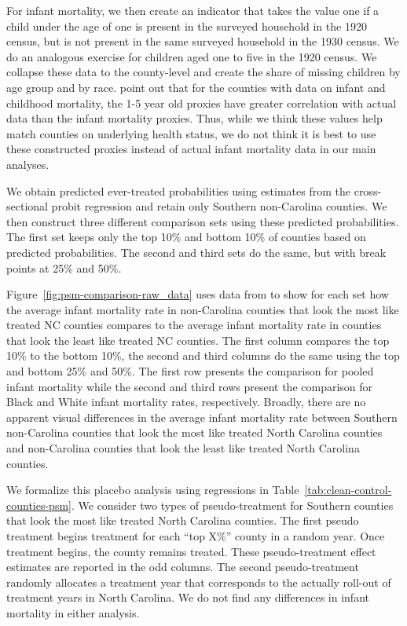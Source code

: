 \documentclass[12pt]{article}
\begin{document}
For infant mortality, we then create an indicator that takes the value one if a child under the age of one is present in the surveyed household in the 1920 census, but is not present in the same surveyed household in the 1930 census. 
We do an analogous exercise for children aged one to five in the 1920 census. 
We collapse these data to the county-level and create the share of missing children by age group and by race. 
 point out that for the counties with data on infant and childhood mortality, the 1-5 year old proxies have greater correlation with actual data than the infant mortality proxies. 
Thus, while we think these values help match counties on underlying health status, we do not think it is best to use these constructed proxies instead of actual infant mortality data in our main analyses. 

We obtain predicted ever-treated probabilities using estimates from the cross-sectional probit regression and retain only Southern non-Carolina counties. 
We then construct three different comparison sets using these predicted probabilities. 
The first set keeps only the top 10\% and bottom 10\% of counties based on predicted probabilities. 
The second and third sets do the same, but with break points at 25\% and 50\%. 

Figure~\ref{fig:psm-comparison-raw_data} uses data from  to show for each set how the average infant mortality rate in non-Carolina counties that look the most like treated NC counties compares to the average infant mortality rate in  counties that look the least like treated NC counties. 
The first column compares the top 10\% to the bottom 10\%, the second and third columns do the same using the top and bottom 25\% and 50\%. 
The first row presents the comparison for pooled infant mortality while the second and third rows present the comparison for Black and White infant mortality rates, respectively. 
Broadly, there are no apparent visual differences in the average infant mortality rate between Southern non-Carolina counties that look the most like treated North Carolina counties and non-Carolina counties that look the least like treated North Carolina counties. 

We formalize this placebo analysis using regressions in Table~\ref{tab:clean-control-counties-psm}.  
We consider two types of pseudo-treatment for Southern counties that look the most like treated North Carolina counties. 
The first pseudo treatment begins treatment for each ``top X\%'' county in a random year. 
Once treatment begins, the county remains treated. 
These pseudo-treatment effect estimates are reported in the odd columns. 
The second pseudo-treatment randomly allocates a treatment year that corresponds to the actually roll-out of treatment years in North Carolina. 
We do not find any differences in infant mortality in either analysis. 
\end{document}
